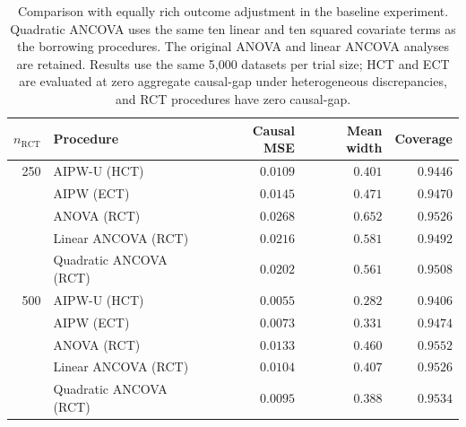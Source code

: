 \begin{table}[!htbp]
\centering
\caption{Comparison with equally rich outcome adjustment in the baseline experiment. Quadratic ANCOVA uses the same ten linear and ten squared covariate terms as the borrowing procedures. The original ANOVA and linear ANCOVA analyses are retained. Results use the same 5,000 datasets per trial size; HCT and ECT are evaluated at zero aggregate causal-gap under heterogeneous discrepancies, and RCT procedures have zero causal-gap.}\label{tab:quadratic-rct}
\small
\begin{tabular*}{\textwidth}{@{\extracolsep{\fill}}rlrrr@{}}
\toprule
$n_{\mathrm{RCT}}$ & Procedure & Causal MSE & Mean width & Coverage\\
\midrule
250 & AIPW-U (HCT) & $0.0109$ & $0.401$ & $0.9446$ \\
 & AIPW (ECT) & $0.0145$ & $0.471$ & $0.9470$ \\
 & ANOVA (RCT) & $0.0268$ & $0.652$ & $0.9526$ \\
 & Linear ANCOVA (RCT) & $0.0216$ & $0.581$ & $0.9492$ \\
 & Quadratic ANCOVA (RCT) & $0.0202$ & $0.561$ & $0.9508$ \\
\midrule
500 & AIPW-U (HCT) & $0.0055$ & $0.282$ & $0.9406$ \\
 & AIPW (ECT) & $0.0073$ & $0.331$ & $0.9474$ \\
 & ANOVA (RCT) & $0.0133$ & $0.460$ & $0.9552$ \\
 & Linear ANCOVA (RCT) & $0.0104$ & $0.407$ & $0.9526$ \\
 & Quadratic ANCOVA (RCT) & $0.0095$ & $0.388$ & $0.9534$ \\
\bottomrule
\end{tabular*}
\end{table}
